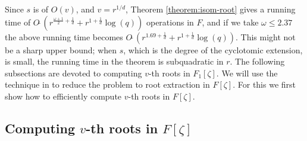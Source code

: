 \documentclass[12pt]{article}
\theoremstyle{plain}
\theoremstyle{definition}
\begin{document}
Since $s$ is of $O(v)$, and $v = r^{1 / d}$, Theorem \ref{theorem:isom-root} gives a running time 
of $O\tilde{\;}(r^{\frac{\omega + 1}{2} + \frac{1}{d}} + r^{1 + \frac{1}{d}}\log(q))$ operations in 
$F$, and if we take $\omega \le 2.37$ the above running time becomes $O\tilde{\;}(r^{1.69 + 
	\frac{1}{d}} + r^{1 + \frac{1}{d}}\log(q))$. This might not be a sharp upper bound; when $s$, 
which 
is the degree of the cyclotomic extension, is small, the running time in the theorem is 
subquadratic in $r$. The following subsections are devoted to computing $v$-th roots in 
$F_1[\zeta]$. We will use the technique in \cite{doliskanischost2011} to reduce the problem to root 
extraction in $F[\zeta]$. For this we first show how to efficiently compute $v$-th roots in 
$F[\zeta]$.




\subsection{Computing $v$-th roots in $F[\zeta]$}
\end{document}
